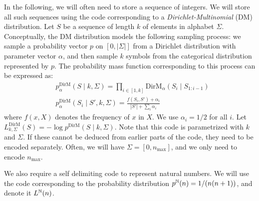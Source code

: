 In the following, we will often need to store a sequence of integers. We will store all such sequences using the code corresponding to a \emph{Dirichlet-Multinomial} (DM) distribution. Let $S$ be a sequence of length $k$ of elements in alphabet $\Sigma$. Conceptually, the DM distribution models the following sampling process: we sample a probability vector $p$ on $[0, |\Sigma|]$ from a Dirichlet distribution with parameter vector $\alpha$, and then sample $k$ symbols from the categorical distribution represented by $p$. The probability mass function corresponding to this process can be expressed as:
\begin{align*}
&p^\text{DirM}_\alpha(S\mid k, \Sigma) = \prod_{i \in [1,k]} \text{DirM}_\alpha(S_i\mid S_{1:i-1})  \\
&p^\text{DirM}_\alpha(S_i \mid S', k, \Sigma) = \frac{f(S_i, S') + \alpha_i}{|S'| + \sum_i \alpha_i}
\end{align*}
where $f(x, X)$ denotes the frequency of $x$ in $X$. We use $\alpha_i = 1/2$ for all $i$. Let $L^\text{DirM}_{k,\Sigma} (S) = -\log p^\text{DirM}(S \mid k, \Sigma)$. Note that this code is parametrized with $k$ and $\Sigma$. If these cannot be deduced from earlier parts of the code, they need to be encoded separately. Often, we will have $\Sigma = [0, n_\text{max}]$, and we only need to encode $n_\text{max}$.

We also require a self delimiting code to represent natural numbers. We will use the code corresponding to the probability distribution $p^{\mathbb N}(n) = 1/ (n(n+1))$, and denote it $L^{\mathbb N}(n)$.


